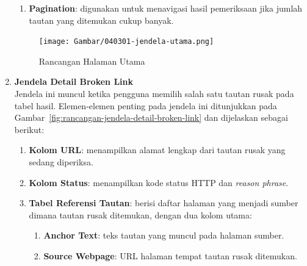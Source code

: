 \begin{enumerate}
\begin{enumerate}
        \item \textbf{Pagination}: digunakan untuk menavigasi hasil pemeriksaan jika jumlah tautan yang ditemukan cukup banyak.
    
    \end{enumerate}

    \begin{figure}[H]
        \centering
        \texttt{[image: Gambar/040301-jendela-utama.png]}
        \caption{Rancangan Halaman Utama}
        \label{fig:rancangan-jendela-utama}
    \end{figure}

    \item \textbf{Jendela Detail Broken Link} \\
    Jendela ini muncul ketika pengguna memilih salah satu tautan rusak pada tabel hasil. Elemen-elemen penting pada jendela ini ditunjukkan pada Gambar~\ref{fig:rancangan-jendela-detail-broken-link} dan dijelaskan sebagai berikut:
    
    \begin{enumerate}
        
        \item \textbf{Kolom URL}: menampilkan alamat lengkap dari tautan rusak yang sedang diperiksa.
        
        \item \textbf{Kolom Status}: menampilkan kode status HTTP dan \textit{reason phrase}.
        
        \item \textbf{Tabel Referensi Tautan}: berisi daftar halaman yang menjadi sumber dimana tautan rusak ditemukan, dengan dua kolom utama:
        \begin{enumerate}
            \item \textbf{Anchor Text}: teks tautan yang muncul pada halaman sumber.
            \item \textbf{Source Webpage}: URL halaman tempat tautan rusak ditemukan.
        \end{enumerate}
    \end{enumerate}


\end{enumerate}
